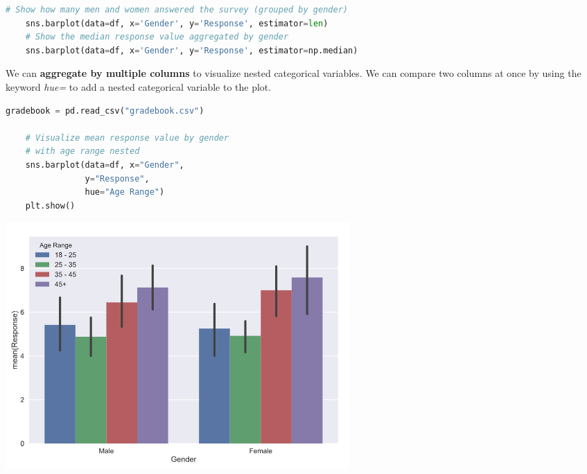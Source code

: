 \documentclass[11pt, a4paper]{article}
\begin{document}
\begin{spacing}{1.1}
\begin{lstlisting}[language=Python]
	# Show how many men and women answered the survey (grouped by gender)
	sns.barplot(data=df, x='Gender', y='Response', estimator=len)
	# Show the median response value aggregated by gender
	sns.barplot(data=df, x='Gender', y='Response', estimator=np.median)\end{lstlisting}\newpage
	\noindent We can \textbf{aggregate by multiple columns} to visualize nested categorical variables. We can compare two columns at once by using the keyword \textit{hue=} to add a nested categorical variable to the plot.
	\begin{minipage}[c]{9cm}
	\begin{lstlisting}[language=Python]
	gradebook = pd.read_csv("gradebook.csv")
	
	# Visualize mean response value by gender 
	# with age range nested
	sns.barplot(data=df, x="Gender", 
	            y="Response", 
	            hue="Age Range")
	plt.show() \end{lstlisting}\vspace*{1mm}
	\end{minipage}
	\begin{minipage}[c]{10cm}
		\hspace*{5mm} \includegraphics[scale=.5]{seamult}
	\end{minipage} \\

\end{spacing}
\end{document}
